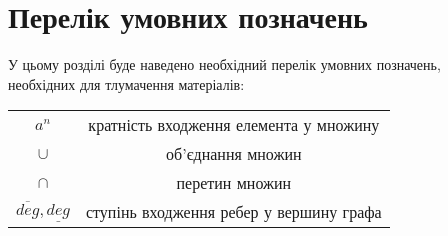\chapter*{Перелік умовних позначень}

У цьому розділі буде наведено необхідний перелік умовних позначень, необхідних для тлумачення матеріалів:
\begin{center}
\begin{tabular}{ |c|c| } 
 \hline
 $a^n$ & кратність входження елемента у множину \\ 
 $\cup$ & об'єднання множин \\ 
 $\cap$  & перетин множин \\ 
 $\overline{deg},\underline{deg}$  & ступінь входження ребер у вершину графа \\ 
 \hline
\end{tabular}
\end{center}



